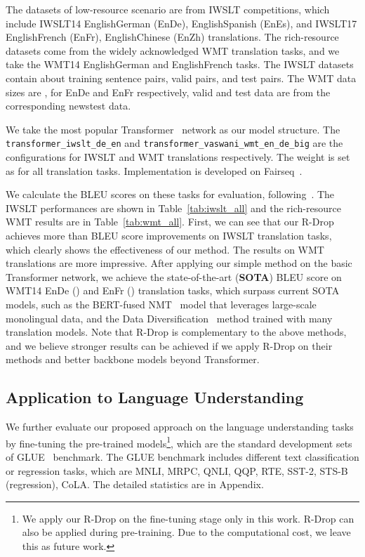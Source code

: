 \documentclass{article}
\begin{document}
 The datasets of low-resource scenario are from IWSLT competitions, which include IWSLT14 EnglishGerman (EnDe), EnglishSpanish (EnEs), and IWSLT17 EnglishFrench (EnFr), EnglishChinese (EnZh) translations. 
The rich-resource datasets come from the widely acknowledged WMT translation tasks, and we take the WMT14 EnglishGerman and EnglishFrench tasks.
The IWSLT datasets contain about  training sentence pairs,  valid pairs, and  test pairs. The WMT data sizes are ,  for EnDe and EnFr respectively, valid and test data are from the corresponding newstest data. 



 We take the most popular Transformer~\cite{vaswani2017attention} network as our model structure. 
The \texttt{transformer\_iwslt\_de\_en} and \texttt{transformer\_vaswani\_wmt\_en\_de\_big} are the configurations for IWSLT and WMT translations respectively.
The weight  is set as  for all translation tasks.
Implementation is developed on Fairseq~\cite{ott2019fairseq}. 


We calculate the BLEU scores on these tasks for evaluation, following~\cite{zhu2019incorporating}. 
The IWSLT performances are shown in Table~\ref{tab:iwslt_all} and the rich-resource WMT results are in Table~\ref{tab:wmt_all}. 
First, we can see that our R-Drop achieves more than  BLEU score improvements on  IWSLT translation tasks, which clearly shows the effectiveness of our method. 
The results on WMT translations are more impressive. 
After applying our simple method on the basic Transformer network, we achieve the state-of-the-art ({\bf SOTA}) BLEU score on WMT14 EnDe () and EnFr () translation tasks, which surpass current SOTA models, such as the BERT-fused NMT~\cite{zhu2019incorporating} model that leverages large-scale monolingual data, and the Data Diversification~\cite{nguyen2020data} method trained with many translation models. Note that R-Drop is complementary to the above methods, and we believe stronger results can be achieved if we apply R-Drop on their methods and better backbone models beyond Transformer. 




\subsection{Application to Language Understanding}

We further evaluate our proposed approach on the language understanding tasks by fine-tuning the pre-trained models\footnote{We apply our R-Drop on the fine-tuning stage only in this work. R-Drop can also be applied during pre-training. Due to the computational cost, we leave this as future work.}, which are the standard development sets of GLUE~\cite{wang2018glue} benchmark. 
The GLUE benchmark includes  different text classification or regression tasks, which are MNLI, MRPC, QNLI, QQP, RTE, SST-2, STS-B (regression), CoLA. The detailed statistics are in Appendix.
\end{document}
